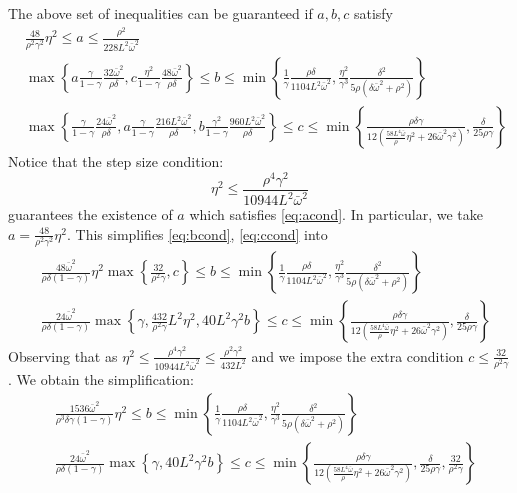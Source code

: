 \documentclass[10pt]{article} %
\theoremstyle{plain}
\theoremstyle{definition}
\theoremstyle{remark}
\newcommand{\bw}{\bar{\omega}}
\begin{document}
The above set of inequalities can be guaranteed if $a,b,c$ satisfy 
\begin{align}
    & \frac{48}{\rho^2 \gamma^2} \eta^2 \leq a \leq \frac{\rho^2}{228 L^2 \bw^2} \label{eq:acond} \\
    & \max\left\{ a \frac{\gamma}{1-\gamma} \frac{32 \bw^2}{\rho \delta} , c \frac{\eta^2}{1-\gamma} \frac{ 48 \bw^2 }{ \rho \delta }  \right\} \leq b \leq \min \left\{ \frac{1}{\gamma} \frac{ \rho \delta }{ 1104 L^2 \bw^2 }, \frac{\eta^2}{\gamma^3} \frac{\delta^2}{5 \rho ( \delta \bw^2 + \rho^2 ) } \right\} \label{eq:bcond} \\
    & \max\left\{ \frac{\gamma}{1-\gamma} \frac{24 \bw^2}{\rho \delta}, a \frac{\gamma}{1-\gamma} \frac{216 L^2 \bw^2 }{\rho \delta}, b \frac{\gamma^2}{1-\gamma} \frac{960 L^2 \bw^2 }{\rho \delta} \right\} \leq c \leq \min \left\{ \frac{ \rho \delta \gamma }{ 12 ( \frac{58 L^4 \bw}{ \rho } \eta^2 + 26 \bw^2 \gamma^2 ) }, \frac{\delta}{ 25 \rho \gamma } \right\} \label{eq:ccond}
\end{align}
Notice that the step size condition:
\[
\eta^2 \leq \frac{ \rho^4 \gamma^2 }{ 10944 L^2 \bw^2 }
\]
guarantees the existence of $a$ which satisfies \eqref{eq:acond}. In particular, we take $a = \frac{ 48 }{ \rho^2 \gamma^2 } \eta^2$. This simplifies \eqref{eq:bcond}, \eqref{eq:ccond} into
\begin{align*}
& \frac{48 \bw^2}{\rho \delta (1-\gamma)} \eta^2 \max\left\{ \frac{32}{ \rho^2 \gamma }, c \right\} \leq b \leq \min \left\{ \frac{1}{\gamma} \frac{ \rho \delta }{ 1104 L^2 \bw^2 }, \frac{\eta^2}{\gamma^3} \frac{\delta^2}{5 \rho ( \delta \bw^2 + \rho^2 ) } \right\} \\
& \frac{24 \bw^2}{\rho \delta (1-\gamma)} \max\left\{ \gamma , \frac{ 432 }{ \rho^2 \gamma } L^2 \eta^2, 40 L^2 \gamma^2 b \right\} \leq c \leq \min \left\{ \frac{ \rho \delta \gamma }{ 12 ( \frac{58 L^4 \bw}{ \rho } \eta^2 + 26 \bw^2 \gamma^2 ) }, \frac{\delta}{ 25 \rho \gamma } \right\}
\end{align*}
Observing that as $\eta^2 \leq \frac{ \rho^4 \gamma^2 }{ 10944 L^2 \bw^2 } \leq \frac{ \rho^2 \gamma^2 }{ 432 L^2 }$ and we impose the extra condition $c \leq \frac{32}{\rho^2 \gamma}$. We obtain the simplification:
\begin{align*}
& \frac{1536 \bw^2}{\rho^3 \delta \gamma (1-\gamma)} \eta^2 \leq b \leq \min \left\{ \frac{1}{\gamma} \frac{ \rho \delta }{ 1104 L^2 \bw^2 }, \frac{\eta^2}{\gamma^3} \frac{\delta^2}{5 \rho ( \delta \bw^2 + \rho^2 ) } \right\} \\
& \frac{24 \bw^2}{\rho \delta (1-\gamma)} \max\left\{ \gamma , 40 L^2 \gamma^2 b \right\} \leq c \leq \min \left\{ \frac{ \rho \delta \gamma }{ 12 ( \frac{58 L^4 \bw}{ \rho } \eta^2 + 26 \bw^2 \gamma^2 ) }, \frac{\delta}{ 25 \rho \gamma }, \frac{32}{\rho^2 \gamma} \right\}
\end{align*}
\end{document}
